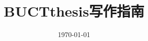 \documentclass[a4paper,12pt,UTF8,oneside]{ctexbook}
\author{\theauthor}
\date{\today}
\def\thesistitle{BUCTthesis写作指南}
\begin{document}
\frontmatter

\title{\thesistitle}
\maketitle





\tableofcontents



\mainmatter


	
	
	











\appendix
	
	
\end{document}
